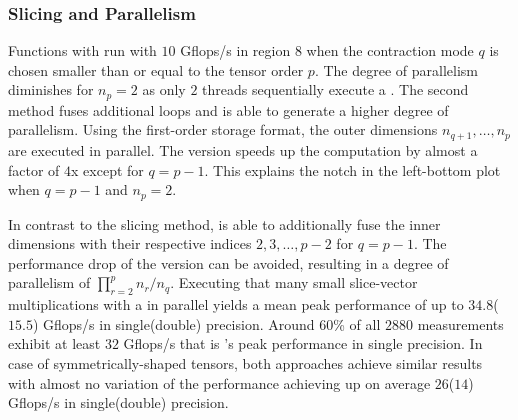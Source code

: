 \subsubsection{Slicing and Parallelism}
Functions with  run with $10$ Gflops/s in region $8$ when the contraction mode $q$ is chosen smaller than or equal to the tensor order $p$.
The degree of parallelism diminishes for $n_p=2$ as only $2$ threads sequentially execute a .
The second method  fuses additional loops and is able to generate a higher degree of parallelism.
Using the first-order storage format, the outer dimensions $n_{q+1}, \dots, n_p$ are executed in parallel.
The  version speeds up the computation by almost a factor of $4$x except for $q = p-1$.
This explains the notch in the left-bottom plot when $q = p-1$ and $n_{p} = 2$.

In contrast to the  slicing method,  is able to additionally fuse the inner dimensions with their respective indices $2,3, \dots, p-2$ for $q=p-1$.
The performance drop of the  version can be avoided, resulting in a degree of parallelism of $\prod_{r=2}^{p} n_{r} / n_q$.
Executing that many small slice-vector multiplications with a  in parallel yields a mean peak performance of up to $34.8$($15.5$) Gflops/s in single(double) precision.
Around $60$\% of all $2880$ measurements exhibit at least $32$ Gflops/s that is 's peak performance in single precision.
In case of symmetrically-shaped tensors, both approaches achieve similar results with almost no variation of the performance achieving up on average $26$($14$) Gflops/s in single(double) precision.

